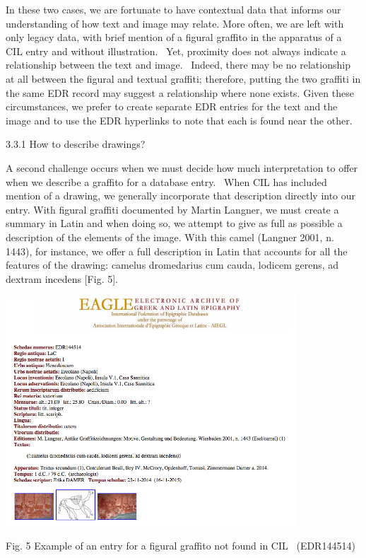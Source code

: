 \documentclass[amsthm,ebook]{saparticle}
\begin{document}
In these two cases, we are fortunate to have contextual data that informs our understanding of how text and image may
relate. More often, we are left with only legacy data, with brief mention of a figural graffito in the apparatus of a
CIL entry and without illustration. \ Yet, proximity does not always indicate a relationship between the text and
image. \ Indeed, there may be no relationship at all between the figural and textual graffiti; therefore, putting the
two graffiti in the same EDR record may suggest a relationship where none exists. Given these circumstances, we prefer
to create separate EDR entries for the text and the image and to use the EDR hyperlinks to note that each is found near
the other.


\bigskip

3.3.1 How to describe drawings? 

A second challenge occurs when we must decide how much interpretation to offer when we describe a graffito for a
database entry. \ When CIL has included mention of a drawing, we generally incorporate that description directly into
our entry. With figural graffiti documented by Martin Langner, we must create a summary in Latin and when doing so, we
attempt to give as full as possible a description of the elements of the image. With this camel (Langner 2001, n.
1443), for instance, we offer a full description in Latin that accounts for all the features of the drawing: camelus
dromedarius cum cauda, lodicem gerens, ad dextram incedens [Fig. 5].


\bigskip

 \includegraphics[width=10.88cm,height=8.608cm]{EAGLE2016BenefielSypniewski-img005.jpg} 

Fig. 5 Example of an entry for a figural graffito not found in CIL \ (EDR144514)
\end{document}
